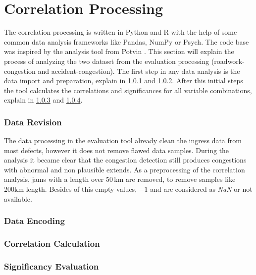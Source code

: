 \section{Correlation Processing}
\label{methodology_correlation_processing}
The correlation processing is written in Python and R with the help of some common data analysis frameworks like Pandas, NumPy or Psych. The code base was inspired by the analysis tool from Potvin \parencite{Potvin2020}. This section will explain the process of analyzing the two dataset from the evaluation processing (roadwork-congestion and accident-congestion). The first step in any data analysis is the data import and preparation, explain in \cref{methodology_correlation_processing_revision} and \cref{methodology_correlation_processing_encoding}. After this initial steps the tool calculates the correlations and significances for all variable combinations, explain in \cref{methodology_correlation_processing_correlation} and \cref{methodology_correlation_processing_significanc}. 

\subsubsection{Data Revision}
\label{methodology_correlation_processing_revision}
The data processing in the evaluation tool already clean the ingress data from most defects, however it does not remove flawed data samples. During the analysis it became clear that the congestion detection still produces congestions with abnormal and non plausible extends. As a preprocessing of the correlation analysis, jams with a length over 50\,km are removed, to remove samples like 200km length. Besides of this empty values, $-1$ and are considered as \textit{NaN} or not available.

\subsubsection{Data Encoding}
\label{methodology_correlation_processing_encoding}


\subsubsection{Correlation Calculation}
\label{methodology_correlation_processing_correlation}


\subsubsection{Significancy Evaluation}
\label{methodology_correlation_processing_significanc}
